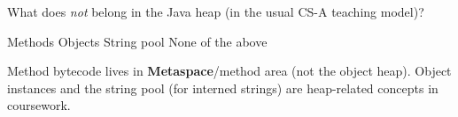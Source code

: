 \question[4]
What does \emph{not} belong in the Java heap (in the usual CS-A teaching model)?
\begin{choices}
  \CorrectChoice Methods
  \choice Objects
  \choice String pool
  \choice None of the above
\end{choices}
\begin{solution}
  Method bytecode lives in \textbf{Metaspace}/method area (not the object heap). Object instances and the string pool (for interned strings) are heap-related concepts in coursework.
\end{solution}

